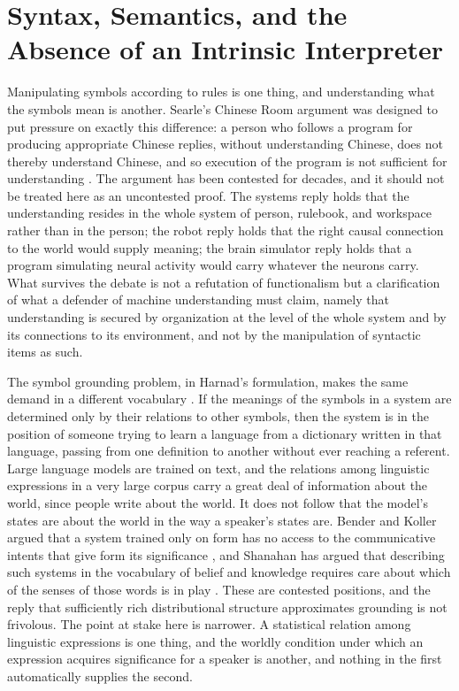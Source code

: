 \documentclass[12pt]{article}
\theoremstyle{definition}
\begin{document}
\section{Syntax, Semantics, and the Absence of an Intrinsic Interpreter}
\label{sec:syntax}

Manipulating symbols according to rules is one thing, and understanding what the symbols mean is another. Searle's Chinese Room argument was designed to put pressure on exactly this difference: a person who follows a program for producing appropriate Chinese replies, without understanding Chinese, does not thereby understand Chinese, and so execution of the program is not sufficient for understanding \cite{searle1980}. The argument has been contested for decades, and it should not be treated here as an uncontested proof. The systems reply holds that the understanding resides in the whole system of person, rulebook, and workspace rather than in the person; the robot reply holds that the right causal connection to the world would supply meaning; the brain simulator reply holds that a program simulating neural activity would carry whatever the neurons carry. What survives the debate is not a refutation of functionalism but a clarification of what a defender of machine understanding must claim, namely that understanding is secured by organization at the level of the whole system and by its connections to its environment, and not by the manipulation of syntactic items as such.

The symbol grounding problem, in Harnad's formulation, makes the same demand in a different vocabulary \cite{harnad1990}. If the meanings of the symbols in a system are determined only by their relations to other symbols, then the system is in the position of someone trying to learn a language from a dictionary written in that language, passing from one definition to another without ever reaching a referent. Large language models are trained on text, and the relations among linguistic expressions in a very large corpus carry a great deal of information about the world, since people write about the world. It does not follow that the model's states are about the world in the way a speaker's states are. Bender and Koller argued that a system trained only on form has no access to the communicative intents that give form its significance \cite{benderkoller2020}, and Shanahan has argued that describing such systems in the vocabulary of belief and knowledge requires care about which of the senses of those words is in play \cite{shanahan2022}. These are contested positions, and the reply that sufficiently rich distributional structure approximates grounding is not frivolous. The point at stake here is narrower. A statistical relation among linguistic expressions is one thing, and the worldly condition under which an expression acquires significance for a speaker is another, and nothing in the first automatically supplies the second.
\end{document}
